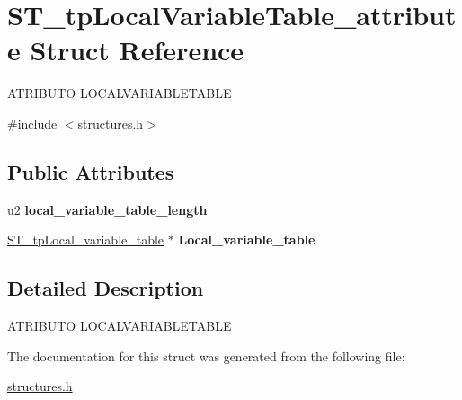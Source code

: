 \hypertarget{structST__tpLocalVariableTable__attribute}{}\section{S\+T\+\_\+tp\+Local\+Variable\+Table\+\_\+attribute Struct Reference}
\label{structST__tpLocalVariableTable__attribute}




 A\+T\+R\+I\+B\+U\+TO L\+O\+C\+A\+L\+V\+A\+R\+I\+A\+B\+L\+E\+T\+A\+B\+LE  




{\ttfamily \#include $<$structures.\+h$>$}

\subsection*{Public Attributes}
\begin{DoxyCompactItemize}
\item 
\mbox{\label{structST__tpLocalVariableTable__attribute_aaf8141f78f2adebaba000d37ea0c543b}} 
u2 {\bfseries local\+\_\+variable\+\_\+table\+\_\+length}
\item 
\mbox{\label{structST__tpLocalVariableTable__attribute_ac1d48d487584d2dd1b26197702b1fda2}} 
\mbox{\hyperlink{structST__tpLocal__variable__table}{S\+T\+\_\+tp\+Local\+\_\+variable\+\_\+table}} $\ast$ {\bfseries Local\+\_\+variable\+\_\+table}
\end{DoxyCompactItemize}


\subsection{Detailed Description}


 A\+T\+R\+I\+B\+U\+TO L\+O\+C\+A\+L\+V\+A\+R\+I\+A\+B\+L\+E\+T\+A\+B\+LE 

The documentation for this struct was generated from the following file\+:\begin{DoxyCompactItemize}
\item 
\mbox{\hyperlink{structures_8h}{structures.\+h}}\end{DoxyCompactItemize}
